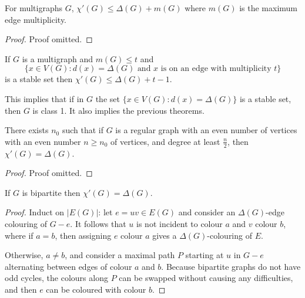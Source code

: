 \documentclass[main.tex]{subfiles}
\begin{document}
\begin{theorem}
  For multigraphs $G$, $\chi'(G)\leq\Delta(G) + m(G)$ where $m(G)$
  is the maximum edge multiplicity.
\end{theorem}
\begin{proof}
  Proof omitted.
\end{proof}
\begin{theorem}
  If $G$ is a multigraph and $m(G)\leq t$ and
  \[
    \{x\in V(G) : d(x) = \Delta(G)\text{ and }x\text{ is on an edge with multiplicity }t\}
  \]
  is a stable set then $\chi'(G)\leq\Delta(G) + t - 1$.
\end{theorem}
This implies that if in $G$ the set $\{x\in V(G) : d(x) = \Delta(G)\}$ is
a stable set, then $G$ is class 1.
It also implies the previous theorems.

\begin{theorem}
  There exists $n_0$ such that if $G$ is a regular graph with an even number of
  vertices with an even number $n\geq n_0$ of vertices,
  and degree at least $\frac n 2$, then $\chi'(G) = \Delta(G)$.
\end{theorem}
\begin{proof}
  Proof omitted.
\end{proof}
\begin{theorem}[Konig 1916]
  If $G$ is bipartite then $\chi'(G) = \Delta(G)$.
\end{theorem}
\begin{proof}
  Induct on $|E(G)|$: let $e = uv\in E(G)$ and consider an $\Delta(G)$-edge
  colouring of $G - e$.
  It follows that $u$ is not incident to colour $a$ and $v$ colour $b$,
  where if $a = b$, then assigning $e$ colour $a$ gives a $\Delta(G)$-colouring
  of $E$.

  Otherwise, $a\neq b$, and consider a maximal path $P$ starting at $u$ in
  $G - e$ alternating between edges of colour $a$ and $b$.
  Because bipartite graphs do not have odd cycles, the colours along $P$
  can be swapped without causing any difficulties, and then $e$ can be coloured
  with colour $b$.
\end{proof}
\end{document}
